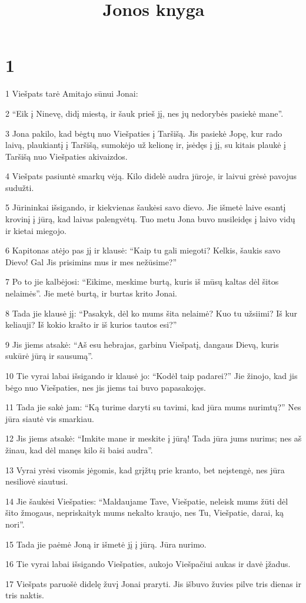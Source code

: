 

\title{Jonos knyga}

\chapter{1}


\par 1 Viešpats tarė Amitajo sūnui Jonai: 
\par 2 “Eik į Ninevę, didį miestą, ir šauk prieš jį, nes jų nedorybės pasiekė mane”. 
\par 3 Jona pakilo, kad bėgtų nuo Viešpaties į Taršišą. Jis pasiekė Jopę, kur rado laivą, plaukiantį į Taršišą, sumokėjo už kelionę ir, įsėdęs į jį, su kitais plaukė į Taršišą nuo Viešpaties akivaizdos. 
\par 4 Viešpats pasiuntė smarkų vėją. Kilo didelė audra jūroje, ir laivui grėsė pavojus sudužti. 
\par 5 Jūrininkai išsigando, ir kiekvienas šaukėsi savo dievo. Jie išmetė laive esantį krovinį į jūrą, kad laivas palengvėtų. Tuo metu Jona buvo nusileidęs į laivo vidų ir kietai miegojo. 
\par 6 Kapitonas atėjo pas jį ir klausė: “Kaip tu gali miegoti? Kelkis, šaukis savo Dievo! Gal Jis prisimins mus ir mes nežūsime?” 
\par 7 Po to jie kalbėjosi: “Eikime, meskime burtą, kuris iš mūsų kaltas dėl šitos nelaimės”. Jie metė burtą, ir burtas krito Jonai. 
\par 8 Tada jie klausė jį: “Pasakyk, dėl ko mums šita nelaimė? Kuo tu užsiimi? Iš kur keliauji? Iš kokio krašto ir iš kurios tautos esi?” 
\par 9 Jis jiems atsakė: “Aš esu hebrajas, garbinu Viešpatį, dangaus Dievą, kuris sukūrė jūrą ir sausumą”. 
\par 10 Tie vyrai labai išsigando ir klausė jo: “Kodėl taip padarei?” Jie žinojo, kad jis bėgo nuo Viešpaties, nes jis jiems tai buvo papasakojęs. 
\par 11 Tada jie sakė jam: “Ką turime daryti su tavimi, kad jūra mums nurimtų?” Nes jūra siautė vis smarkiau. 
\par 12 Jis jiems atsakė: “Imkite mane ir meskite į jūrą! Tada jūra jums nurims; nes aš žinau, kad dėl manęs kilo ši baisi audra”. 
\par 13 Vyrai yrėsi visomis jėgomis, kad grįžtų prie kranto, bet neįstengė, nes jūra nesiliovė siautusi. 
\par 14 Jie šaukėsi Viešpaties: “Maldaujame Tave, Viešpatie, neleisk mums žūti dėl šito žmogaus, nepriskaityk mums nekalto kraujo, nes Tu, Viešpatie, darai, ką nori”. 
\par 15 Tada jie paėmė Joną ir išmetė jį į jūrą. Jūra nurimo. 
\par 16 Tie vyrai labai išsigando Viešpaties, aukojo Viešpačiui aukas ir davė įžadus. 
\par 17 Viešpats paruošė didelę žuvį Jonai praryti. Jis išbuvo žuvies pilve tris dienas ir tris naktis.


